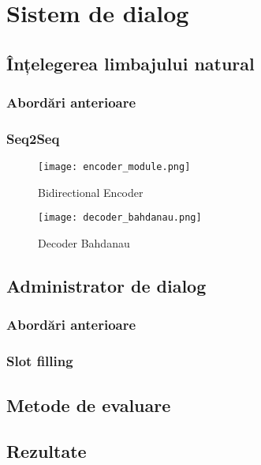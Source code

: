 \chapter{Sistem de dialog}

\section{Înțelegerea limbajului natural}

\subsection{Abordări anterioare}

\subsection{Seq2Seq}

\begin{figure}[h]
	\centering
	\texttt{[image: encoder\_module.png]}
	\caption{Bidirectional Encoder}
	\label{fig:enc_module}
\end{figure}


\begin{figure}[h]
	\centering
	\texttt{[image: decoder\_bahdanau.png]}
	\caption{Decoder Bahdanau}
	\label{fig:dec_bah}
\end{figure}

\section{Administrator de dialog}

\subsection{Abordări anterioare}

\subsection{Slot filling}

\section{Metode de evaluare}

\section{Rezultate}